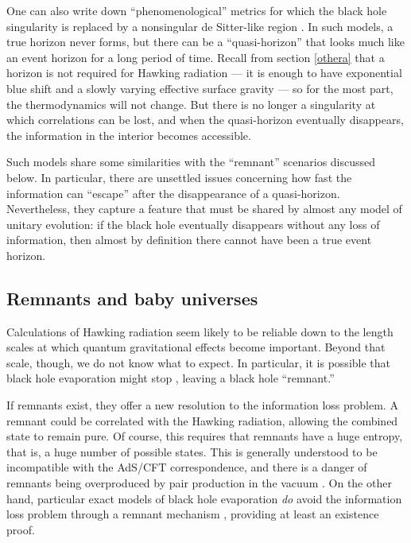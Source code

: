 \documentclass[11pt]{article}
\begin{document}
One can also write down ``phenomenological'' metrics for
which the black hole singularity is replaced by a nonsingular
de Sitter-like region \cite{FrolovVil,Hayward,Frolov,Bardeen}.
In such models, a true horizon never forms, but there can be a
``quasi-horizon'' that looks much like an event horizon for 
a long period of time.  Recall from section \ref{othera} that
a horizon is not required for Hawking radiation --- it is 
enough to have exponential blue shift and a slowly varying 
effective surface gravity --- so for the most part, the
thermodynamics will not change.  But there is no longer
a singularity at which correlations can be lost, and when
the quasi-horizon eventually disappears, the information
in the interior becomes accessible.

Such models share some similarities with the ``remnant''
scenarios discussed below.  In particular, there are unsettled
issues concerning how fast the information can ``escape'' 
after the disappearance of a quasi-horizon.  Nevertheless,
they capture a feature that must be shared by almost any
model of unitary evolution: if the black hole eventually
disappears without any loss of information, then almost by
definition there cannot have been a true event horizon.

\subsection{Remnants and baby universes}

Calculations of Hawking radiation seem likely to be reliable
down to the length scales at which quantum gravitational effects 
become important.  Beyond that scale, though, we do not know 
what to expect.  In particular, it is possible that black hole 
evaporation might stop \cite{Aharanov}, leaving a black hole 
``remnant.'' 
  
If remnants exist, they offer a new resolution to the
information loss problem.  A remnant could be
correlated with the  Hawking radiation, allowing
the combined state to remain pure.  Of course, this requires
that remnants have a huge entropy, that is, a huge number of 
possible states.  This is generally understood to be incompatible
with the AdS/CFT correspondence, and there is a danger of
remnants being overproduced by pair production in the vacuum
\cite{Giddingsx}.  On the other hand, particular exact models 
of black hole evaporation \emph{do} avoid the information
loss problem through a remnant mechanism \cite{Almheiri},
providing at least an existence proof.
\end{document}
